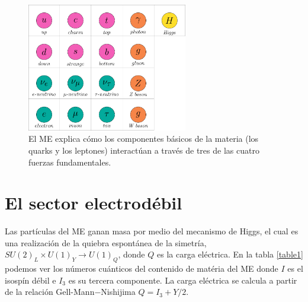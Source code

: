 \begin{figure}[!h]
\centering
\includegraphics[width=7cm]{Images/SM-particles.pdf}
\caption[Campos cuánticos del Modelo Estándar]{El ME explica cómo los componentes básicos de la materia (los quarks y los leptones) interactúan a través de tres de las cuatro fuerzas fundamentales.}
\label{SMparticles}
\end{figure}


\section[\hspace{-0.175in} El sector electrodébil]{El sector electrodébil}

Las partículas del ME ganan masa por medio del mecanismo de Higgs, el cual es una realización de la quiebra espontánea de la simetría, $SU(2)_L \times U(1)_Y \rightarrow U(1)_Q$, donde $Q$ es la carga eléctrica. En la tabla \ref{table1} podemos ver los números cuánticos del contenido de matéria del ME donde $I$ es el isospín débil e $I_3$ es su tercera componente. La carga eléctrica se calcula a partir de la relación Gell-Mann$-$Nishijima $Q=I_3 + Y/2$. 


